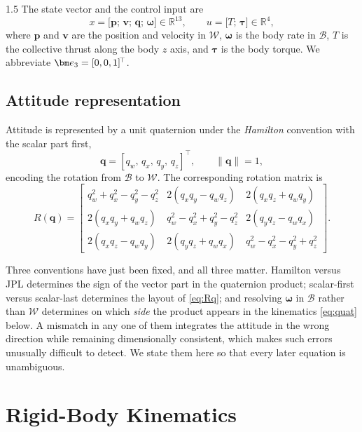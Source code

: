\begin{spacing}{1.5}
The state vector and the control input are
\begin{equation}
x = \bigl[\bm{p};\, \bm{v};\, \bm{q};\, \bm{\omega}\bigr] \in \mathbb{R}^{13},
\qquad
u = \bigl[T;\, \bm{\tau}\bigr] \in \mathbb{R}^{4},
\label{eq:state}
\end{equation}
where $\bm{p}$ and $\bm{v}$ are the position and velocity in
$\mathcal{W}$, $\bm{\omega}$ is the body rate in $\mathcal{B}$, $T$ is the
collective thrust along the body $z$ axis, and $\bm{\tau}$ is the body
torque. We abbreviate $\ev = [0,0,1]^{\!\top}$.

\subsection{Attitude representation}\label{sec:model:quat}

Attitude is represented by a unit quaternion under the \emph{Hamilton}
convention with the scalar part first,
\begin{equation}
\bm{q} = [q_w,\, q_x,\, q_y,\, q_z]^{\!\top},
\qquad \|\bm{q}\| = 1,
\label{eq:quatdef}
\end{equation}
encoding the rotation from $\mathcal{B}$ to $\mathcal{W}$. The
corresponding rotation matrix is
\begin{equation}
R(\bm{q}) =
\begin{bmatrix}
q_w^2 + q_x^2 - q_y^2 - q_z^2 & 2(q_xq_y - q_wq_z) & 2(q_xq_z + q_wq_y) \\[2pt]
2(q_xq_y + q_wq_z) & q_w^2 - q_x^2 + q_y^2 - q_z^2 & 2(q_yq_z - q_wq_x) \\[2pt]
2(q_xq_z - q_wq_y) & 2(q_yq_z + q_wq_x) & q_w^2 - q_x^2 - q_y^2 + q_z^2
\end{bmatrix}.
\label{eq:Rq}
\end{equation}

Three conventions have just been fixed, and all three matter. Hamilton
versus JPL determines the sign of the vector part in the quaternion
product; scalar-first versus scalar-last determines the layout of
\eqref{eq:Rq}; and resolving $\bm{\omega}$ in $\mathcal{B}$ rather than
$\mathcal{W}$ determines on which \emph{side} the product appears in the
kinematics \eqref{eq:quat} below. A mismatch in any one of them
integrates the attitude in the wrong direction while remaining
dimensionally consistent, which makes such errors unusually difficult to
detect. We state them here so that every later equation is unambiguous.

\section{Rigid-Body Kinematics}\label{sec:model:kin}


\end{spacing}
